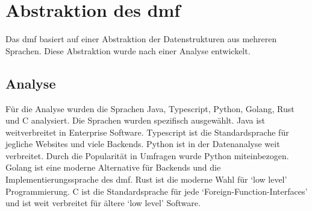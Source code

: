 \documentclass[./einleitung.tex]{subfiles}
\begin{document}
    \section{Abstraktion des \acrshort{dmf}}
    Das \acrshort{dmf} basiert auf einer Abstraktion der Datenstrukturen aus mehreren Sprachen.
    Diese Abstraktion wurde nach einer Analyse entwickelt.

    \subsection{Analyse}
    Für die Analyse wurden die Sprachen Java, Typescript, Python, Golang, Rust und C analysiert.
    Die Sprachen wurden spezifisch ausgewählt.
    Java ist weitverbreitet in Enterprise Software.
    Typescript ist die Standardsprache für jegliche Websites und viele Backends.
    Python ist in der Datenanalyse weit verbreitet.
    Durch die Popularität in Umfragen wurde Python miteinbezogen.
    Golang ist eine moderne Alternative für Backends und die Implementierungssprache des \acrshort{dmf}.
    Rust ist die moderne Wahl für `low level' Programmierung.
    C ist die Standardsprache für jede `Foreign-Function-Interfaces' und ist weit verbreitet für ältere `low level' Software.
\end{document}
